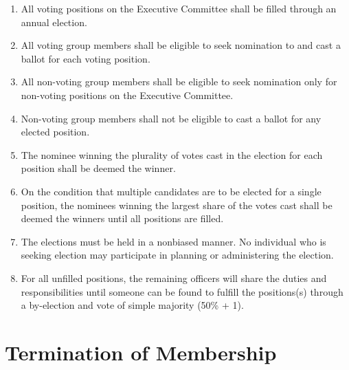 \documentclass[12pt,a4paper]{article}
\begin{document}
\begin{enumerate}
\item All voting positions on the Executive Committee shall be filled through an annual election.

\item All voting group members shall be eligible to seek nomination to and cast a ballot for each voting position.

\item All non-voting group members shall be eligible to seek nomination only for non-voting positions on the Executive Committee.

\item Non-voting group members shall not be eligible to cast a ballot for any elected position.

\item The nominee winning the plurality of votes cast in the election for each position shall be deemed the winner.

\item On the condition that multiple candidates are to be elected for a single position, the nominees winning the largest share of the votes cast shall be deemed the winners until all positions are filled.

\item The elections must be held in a nonbiased manner. No individual who is seeking election may participate in planning or administering the election.

\item For all unfilled positions, the remaining officers will share the duties and responsibilities until someone can be found to fulfill the positions(s) through a by-election and vote of simple majority (50\% + 1).
\end{enumerate}

\section{Termination of Membership}
\end{document}
